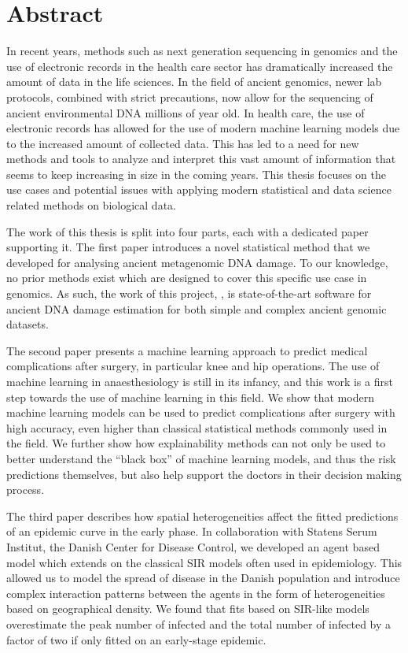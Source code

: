 \chapter{Abstract}


In recent years, methods such as next generation sequencing in genomics and the use of electronic records in the health care sector has dramatically increased the amount of data in the life sciences. In the field of ancient genomics, newer lab protocols, combined with strict precautions, now allow for the sequencing of ancient environmental DNA millions of year old. In health care, the use of electronic records has allowed for the use of modern machine learning models due to the increased amount of collected data.
This has led to a need for new methods and tools to analyze and interpret this vast amount of information that seems to keep increasing in size in the coming years. This thesis focuses on the use cases and potential issues with applying modern statistical and data science related methods on biological data.

The work of this thesis is split into four parts, each with a dedicated paper supporting it. The first paper introduces a novel statistical method that we developed for analysing ancient metagenomic DNA damage. To our knowledge, no prior methods exist which are designed to cover this specific use case in genomics. As such, the work of this project, \metaDMG, is state-of-the-art software for ancient DNA damage estimation for both simple and complex ancient genomic datasets.

The second paper presents a machine learning approach to predict medical complications after surgery, in particular knee and hip operations. The use of machine learning in anaesthesiology is still in its infancy, and this work is a first step towards the use of machine learning in this field. We show that modern machine learning models can be used to predict complications after surgery with high accuracy, even higher than classical statistical methods commonly used in the field.  We further show how explainability methods can not only be used to better understand the ``black box'' of machine learning models, and thus the risk predictions themselves, but also help support the doctors in their decision making process.

The third paper describes how spatial heterogeneities affect the fitted predictions of an epidemic curve in the early phase. In collaboration with Statens Serum Institut, the Danish Center for Disease Control, we developed an agent based model which extends on the classical SIR models often used in epidemiology. This allowed us to model the spread of disease in the Danish population and introduce complex interaction patterns between the agents in the form of heterogeneities based on geographical density. We found that fits based on SIR-like models overestimate the peak number of infected and the total number of infected by a factor of two if only fitted on an early-stage epidemic.

